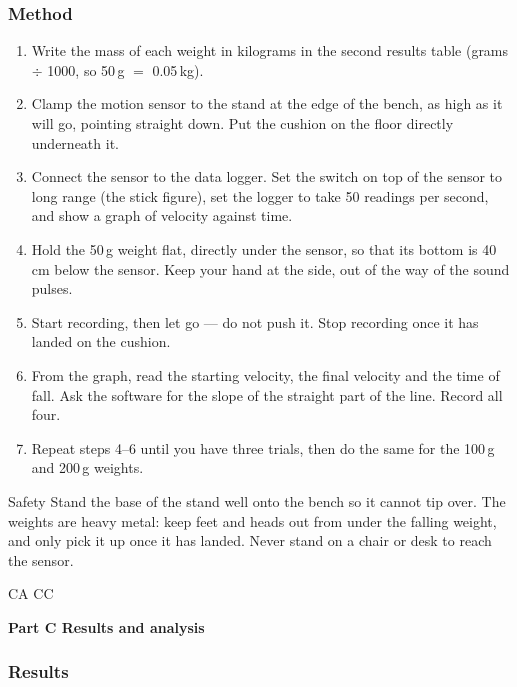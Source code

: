 \documentclass[11pt,a4paper]{article}
\newcommand{\lessonpart}[3]{%
  \par\if#1A\needspace{10\baselineskip}\vspace{10pt}\else
    \if#1C\notesfill\fi\clearpage\fi
  \begin{tcolorbox}[enhanced, breakable=false, arc=2mm, boxrule=0pt,
    colback=#3!14, borderline west={4pt}{0pt}{#3},
    left=4mm, right=3mm, top=1.6mm, bottom=1.6mm]
  {\headingfont\bfseries\color{#3!60!black}\large Part #1 \textbullet{} #2}
  \end{tcolorbox}\vspace{2pt}}
\def\anslabel{}\def\anspart{}
\newcommand{\anslabelset}[1]{\xdef\anslabel{#1}\gdef\anspart{}}
\newcommand{\notesfill}{\par
  \ifdim\dimexpr\pagegoal-\pagetotal\relax>3.2cm
    \vspace*{\fill}%
    \begin{tcolorbox}[enhanced, breakable=false, arc=2mm, colback=Paper, colframe=Line,
      left=2mm, right=2mm, top=1mm, bottom=1mm, boxrule=1pt,
      height=\dimexpr\pagegoal-\pagetotal-1.0cm\relax]
      {\small\headingfont\color{DarkGrey}Notes}
    \end{tcolorbox}%
  \fi}
\begin{document}
\subsubsection*{Method}
\begin{enumerate}[itemsep=2pt]
  \item Write the mass of each weight in kilograms in the second results table (grams $\div$ 1000, so 50\,g $=$ 0.05\,kg).
  \item Clamp the motion sensor to the stand at the edge of the bench, as high as it will go, pointing straight down. Put the cushion on the floor directly underneath it.
  \item Connect the sensor to the data logger. Set the switch on top of the sensor to long range (the stick figure), set the logger to take 50 readings per second, and show a graph of velocity against time.
  \item Hold the 50\,g weight flat, directly under the sensor, so that its bottom is 40\,cm below the sensor. Keep your hand at the side, out of the way of the sound pulses.
  \item Start recording, then let go --- do not push it. Stop recording once it has landed on the cushion.
  \item From the graph, read the starting velocity, the final velocity and the time of fall. Ask the software for the slope of the straight part of the line. Record all four.
  \item Repeat steps 4--6 until you have three trials, then do the same for the 100\,g and 200\,g weights.
\end{enumerate}

\begin{infobox}{Safety}
Stand the base of the stand well onto the bench so it cannot tip over. The weights are heavy metal: keep feet and heads out from under the falling weight, and only pick it up once it has landed. Never stand on a chair or desk to reach the sensor.
\end{infobox}

\lessonpart{C}{Results and analysis}{Amber}\label{prac:13}

\subsubsection*{Results}\anslabelset{Results}
\end{document}

